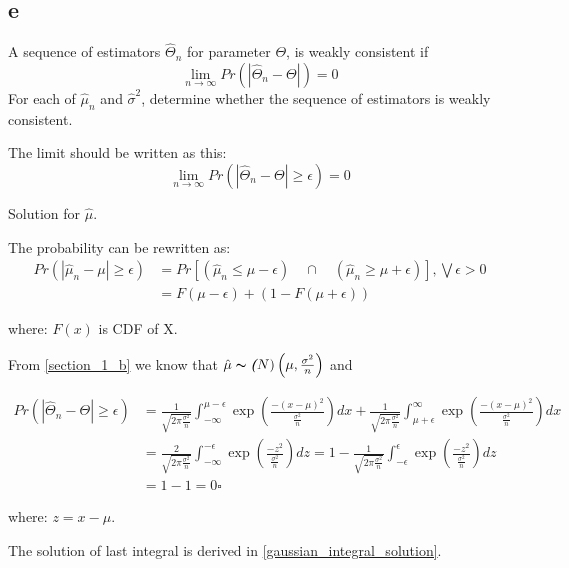 \subsection{e}
A sequence of estimators $\mathit{\hat{\Theta}_n}$ for parameter $\mathit{\Theta}$, is weakly consistent if 
\begin{equation}
\lim_{n \to \infty} Pr(|\mathit{\hat{\Theta}_n - \Theta}|) = 0
\end{equation}
For each of $\mathit{\hat{\mu}_n}$ and $\mathit{\hat{\sigma}^2}$, determine whether the sequence of estimators is weakly consistent.


The limit should be written as this:
\begin{equation}
\lim_{n \to \infty} Pr(|\mathit{\hat{\Theta}_n - \Theta}| \geq \epsilon) = 0
\end{equation}

\begin{solution}
Solution for $\hat{\mu}$.

The probability can be rewritten as:
\begin{equation}
\begin{split}
Pr(|\hat{\mu}_n - \mu| \geq \epsilon) 
	 & = Pr[(\hat{\mu}_n \leq  \mu - \epsilon) \quad \cap \quad (\hat{\mu}_n \geq  \mu + \epsilon)], \bigvee \epsilon > 0 \\ 
	 & = F(\mu - \epsilon) + \left(1 -  F(\mu + \epsilon)\right)
\end{split}
\end{equation}

where: $F(x)$ is CDF of X.

From \ref{section_1_b} we know that $\hat{\mu} \thicksim \textbf{\em (}N)\left(\mu, \frac{\sigma^2}{n}\right)$ and 

\begin{equation}
\begin{split}
Pr(|\mathit{\hat{\Theta}_n - \Theta}| \geq \epsilon) 
	 & = \frac{1}{\sqrt{2\pi\frac{\sigma^2}{n}}}\int_{-\infty}^{\mu-\epsilon}\exp\left(\frac{-(x-\mu)^2}{\frac{\sigma^2}{n}}\right)dx 
				+ \frac{1}{\sqrt{2\pi\frac{\sigma^2}{n}}}\int_{\mu+\epsilon}^{\infty}\exp\left(\frac{-(x-\mu)^2}{\frac{\sigma^2}{n}}\right)dx \\
	 & = \frac{2}{\sqrt{2\pi\frac{\sigma^2}{n}}}\int_{-\infty}^{-\epsilon}\exp\left(\frac{-z^2}{\frac{\sigma^2}{n}}\right)dz 
	   = 1 - \frac{1}{\sqrt{2\pi\frac{\sigma^2}{n}}}\int_{-\epsilon}^{\epsilon}\exp\left(\frac{-z^2}{\frac{\sigma^2}{n}}\right)dz \\
	&  = 1 - 1 = 0\square
\end{split}
\end{equation}
 
where: $z=x-\mu$.

The solution of last integral is derived in \ref{gaussian_integral_solution}.

\end{solution}

